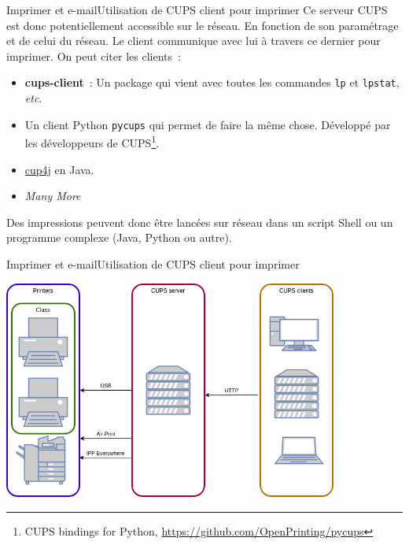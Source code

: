 \documentclass{beamer}
\begin{document}
    \begin{frame}{Imprimer et e-mail}{Utilisation de CUPS client pour imprimer}
        Ce serveur CUPS est donc potentiellement accessible sur le réseau.
        En fonction de son paramétrage et de celui du réseau.
        \bigbreak
        Le client communique avec lui à travers ce dernier pour imprimer.
        On peut citer les clients~:
        \begin{itemize}
            \item \textbf{cups-client}~: Un package qui vient avec toutes les commandes \lstinline{lp} et \lstinline{lpstat}, \textit{etc}.
            \item Un client Python \lstinline{pycups} qui permet de faire la même chose. Développé par les développeurs de CUPS\footnote{CUPS bindings for Python, \url{https://github.com/OpenPrinting/pycups}}.
            \item \href{https://github.com/harwey/cups4j}{cup4j} en Java.
            \item \textit{Many More}
        \end{itemize}
        Des impressions peuvent donc être lancées sur réseau dans un script Shell ou un programme complexe (Java, Python ou autre).
    \end{frame}

    \begin{frame}{Imprimer et e-mail}{Utilisation de CUPS client pour imprimer}
        \begin{center}
            \includegraphics[width=11cm]{image/cups.drawio}
        \end{center}
    \end{frame}
\end{document}
